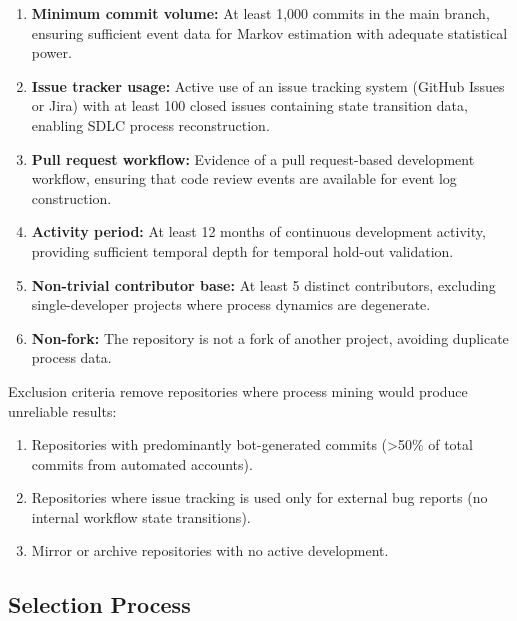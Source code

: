 \begin{enumerate}
    \item \textbf{Minimum commit volume:} At least 1{,}000 commits in the 
    main branch, ensuring sufficient event data for Markov estimation 
    with adequate statistical power.
    
    \item \textbf{Issue tracker usage:} Active use of an issue tracking 
    system (GitHub Issues or Jira) with at least 100 closed issues 
    containing state transition data, enabling SDLC process reconstruction.
    
    \item \textbf{Pull request workflow:} Evidence of a pull request-based 
    development workflow, ensuring that code review events are available 
    for event log construction.
    
    \item \textbf{Activity period:} At least 12 months of continuous 
    development activity, providing sufficient temporal depth for 
    temporal hold-out validation.
    
    \item \textbf{Non-trivial contributor base:} At least 5 distinct 
    contributors, excluding single-developer projects where process 
    dynamics are degenerate.
    
    \item \textbf{Non-fork:} The repository is not a fork of another 
    project, avoiding duplicate process data.
\end{enumerate}

Exclusion criteria remove repositories where process mining would produce 
unreliable results:

\begin{enumerate}
    \item Repositories with predominantly bot-generated commits 
    (>50\% of total commits from automated accounts).
    
    \item Repositories where issue tracking is used only for external 
    bug reports (no internal workflow state transitions).
    
    \item Mirror or archive repositories with no active development.
\end{enumerate}


\subsection{Selection Process}
\label{sec:selection-process}

